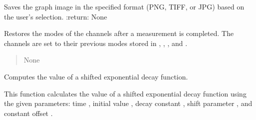 \documentclass[letterpaper,10pt,english]{sphinxmanual}
\begin{document}
\begin{fulllineitems}
\begin{fulllineitems}
\label{\detokenize{FLIMGraphics:FLIMGraphics.FLIMGraphic.savePlotFLIM}}
\pysigstartsignatures
{}
\pysigstopsignatures
\sphinxAtStartPar
Saves the graph image in the specified format (PNG, TIFF, or JPG) based on the user’s selection.
:return: None

\end{fulllineitems}


\begin{fulllineitems}
\label{\detokenize{FLIMGraphics:FLIMGraphics.FLIMGraphic.setOldMode}}
\pysigstartsignatures
{}
\pysigstopsignatures
\sphinxAtStartPar
Restores the modes of the channels after a measurement is completed.
The channels are set to their previous modes stored in , 
, , and .
\begin{quote}\begin{description}
\sphinxAtStartPar
None

\end{description}\end{quote}

\end{fulllineitems}


\begin{fulllineitems}
\label{\detokenize{FLIMGraphics:FLIMGraphics.FLIMGraphic.shifted_decay_function}}
\pysigstartsignatures
{}
\pysigstopsignatures
\sphinxAtStartPar
Computes the value of a shifted exponential decay function.

\sphinxAtStartPar
This function calculates the value of a shifted exponential decay function using the given parameters: 
time , initial value , decay constant , shift parameter , and constant offset .


\end{fulllineitems}
\end{fulllineitems}
\end{document}
